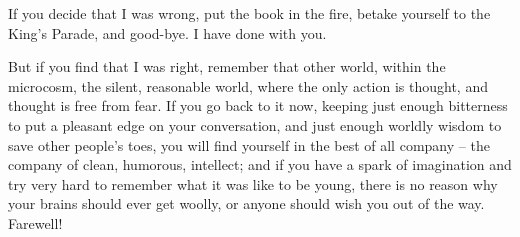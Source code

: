 \documentclass[12pt, oneside, b5paper]{memoir}
\begin{document}
If you decide that I was wrong, put the book in the fire, betake yourself to the King's Parade, and good-bye. I have done with you.

But if you find that I was right, remember that other world, within the microcosm, the silent, reasonable world, where the only action is thought, and thought is free from fear. If you go back to it now, keeping just enough bitterness to put a pleasant edge on your conversation, and just enough worldly wisdom to save other people's toes, you will find yourself in the best of all company -- the company of clean, humorous, intellect; and if you have a spark of imagination and try very hard to remember what it was like to be young, there is no reason why your brains should ever get woolly, or anyone should wish you out of the way. Farewell!

\backmatter
\printindex
\end{document}
